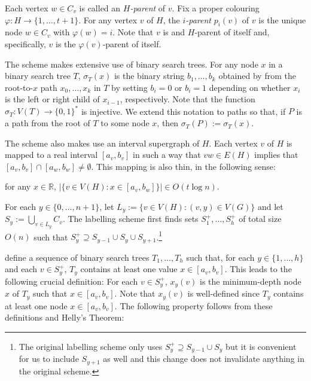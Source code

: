 \documentclass{patmorin}
\newcommand{\R}{\mathbb{R}}
\begin{document}
Each vertex $w\in C_v$ is called an \emph{$H$-parent} of $v$.  Fix a proper colouring $\varphi:H\to\{1,\ldots,t+1\}$.  For any vertex $v$ of $H$, the \emph{$i$-parent} $p_i(v)$ of $v$ is the unique node $w\in C_v$ with $\varphi(w)=i$.  Note that $v$ is and $H$-parent of itself and, specifically, $v$ is the $\varphi(v)$-parent of itself.

The scheme makes extensive use of binary search trees.  For any node $x$ in a binary search tree $T$, $\sigma_T(x)$ is the binary string $b_1,\ldots,b_k$ obtained by from the root-to-$x$ path $x_0,\ldots,x_k$ in $T$ by setting $b_i=0$ or $b_i=1$ depending on whether $x_i$ is the left or right child of $x_{i-1}$, respectively. Note that the function $\sigma_T:V(T)\to\{0,1\}^*$ is injective.  We extend this notation to paths so that, if $P$ is a path from the root of $T$ to some node $x$, then $\sigma_T(P):=\sigma_T(x)$.


The scheme also makes use an interval supergraph of $H$.  Each vertex $v$ of $H$ is mapped to a real interval $[a_v,b_v]$ in such a way that $vw\in E(H)$ implies that $[a_v,b_v]\cap [a_w,b_w]\neq\emptyset$.  This mapping is also thin, in the following sense:

\begin{compactenum}[(P1)]
    \item for any $x\in \R$, $|\{v\in V(H): x\in[a_v,b_w]\}|\in O(t\log n)$.\label{thin}
\end{compactenum}

For each $y\in\{0,\ldots,n+1\}$, let $L_y:=\{v\in V(H): (v,y)\in V(G)\}$ and let $S_y:=\bigcup_{v\in L_y}C_v$.  The labelling scheme first finds sets $S^+_1,\ldots,S^+_h$ of total size $O(n)$ such that $S^+_y\supseteq S_{y-1}\cup S_y\cup S_{y+1}$.\footnote{The original labelling scheme only uses $S^+_y\supseteq S_{y-1}\cup S_y$ but it is convenient for us to include $S_{y+1}$ as well and this change does not invalidate anything in the original scheme.}

\citet{dujmovic.esperet.ea:adjacency} define a sequence of binary search trees $T_1,\ldots,T_h$ such that, for each $y\in\{1,\ldots,h\}$ and each $v\in S^+_y$, $T_y$ contains at least one value $x\in [a_v,b_v]$.  This leads to the following crucial definition: For each $v\in S^+_y$, $x_{y}(v)$ is the minimum-depth node $x$ of $T_y$ such that $x\in [a_v,b_v]$. Note that $x_y(v)$ is well-defined since $T_y$ contains at least one node $x\in[a_v,b_v]$.   The following property follows from these definitions and Helly's Theorem:
\end{document}
